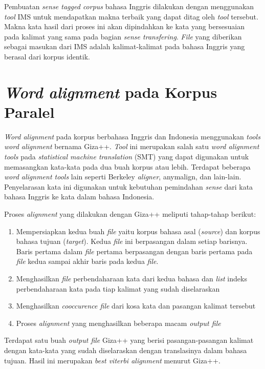 Pembuatan \textit{sense tagged corpus} bahasa Inggris dilakukan dengan menggunakan \textit{tool} IMS untuk mendapatkan makna terbaik yang dapat ditag oleh \textit{tool} tersebut. Makna kata hasil dari proses ini akan dipindahkan ke kata yang bersesuaian pada kalimat yang sama pada bagian \textit{sense transfering}. \textit{File} yang diberikan sebagai masukan dari IMS adalah kalimat-kalimat pada bahasa Inggris yang berasal dari korpus identik.
\section{\textit{Word alignment} pada Korpus Paralel}
\textit{Word alignment} pada korpus berbahasa Inggris dan Indonesia menggunakan \textit{tools word alignment} bernama Giza++. \textit{Tool} ini merupakan salah satu \textit{word alignment tools} pada \textit{statistical machine translation} (SMT) yang dapat digunakan untuk memasangkan kata-kata pada dua buah korpus atau lebih. Terdapat beberapa \textit{word alignment tools} lain seperti Berkeley \textit{aligner}, anymalign, dan lain-lain. Penyelarasan kata ini digunakan untuk kebutuhan pemindahan \textit{sense} dari kata bahasa Inggris ke kata dalam bahasa Indonesia.

Proses \textit{alignment} yang dilakukan dengan Giza++ meliputi tahap-tahap berikut:
\begin{enumerate}
	\item Mempersiapkan kedua buah \textit{file} yaitu korpus bahasa asal (\textit{source}) dan korpus bahasa tujuan (\textit{target}). Kedua \textit{file} ini berpasangan dalam setiap barisnya. Baris pertama dalam \textit{file} pertama berpasangan dengan baris pertama pada \textit{file} kedua sampai akhir baris pada kedua \textit{file}.
	\item Menghasilkan \textit{file} perbendaharaan kata dari kedua bahasa dan \textit{list} indeks perbendaharaan kata pada tiap kalimat yang sudah diselaraskan
	\item Menghasilkan \textit{cooccurence file} dari kosa kata dan pasangan kalimat tersebut
	\item Proses \textit{alignment} yang menghasilkan beberapa macam \textit{output file} 
\end{enumerate}

Terdapat satu buah \textit{output file} Giza++ yang berisi pasangan-pasangan kalimat dengan kata-kata yang sudah diselaraskan dengan translasinya dalam bahasa tujuan. Hasil ini merupakan \textit{best viterbi alignment} menurut Giza++.

